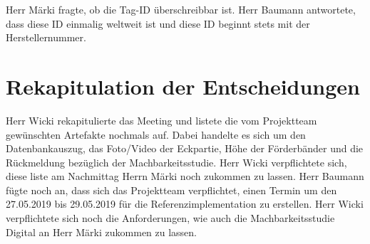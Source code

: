 \documentclass[parskip=full, a4paper]{scrreprt}
\begin{document}
Herr Märki fragte, ob die Tag-ID überschreibbar ist. Herr Baumann antwortete, dass diese ID einmalig weltweit ist und diese ID beginnt stets mit der Herstellernummer.

\chapter{Rekapitulation der Entscheidungen}
Herr Wicki rekapitulierte das Meeting und listete die vom Projektteam gewünschten Artefakte nochmals auf. Dabei handelte es sich um den Datenbankauszug, das Foto/Video der Eckpartie, Höhe der Förderbänder und die Rückmeldung bezüglich der Machbarkeitsstudie. Herr Wicki verpflichtete sich, diese liste am Nachmittag Herrn Märki noch zukommen zu lassen. Herr Baumann fügte noch an, dass sich das Projektteam verpflichtet, einen Termin um den 27.05.2019 bis 29.05.2019 für die Referenzimplementation zu erstellen.  Herr Wicki verpflichtete sich noch die Anforderungen, wie auch die Machbarkeitsstudie Digital an Herr Märki zukommen zu lassen.
\end{document}

